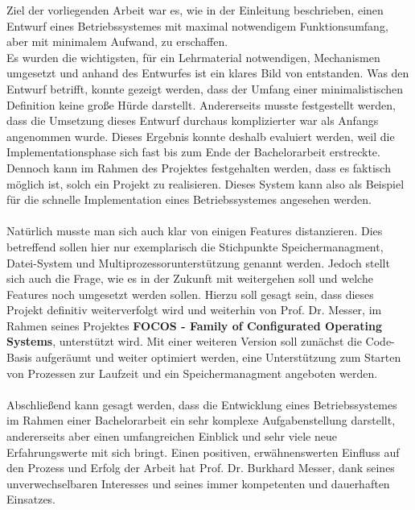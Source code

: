 Ziel der vorliegenden Arbeit war es, wie in der Einleitung beschrieben, einen Entwurf eines Betriebssystemes mit maximal notwendigem Funktionsumfang, aber mit minimalem Aufwand, zu erschaffen.\\
Es wurden die wichtigsten, f\"ur ein Lehrmaterial notwendigen, Mechanismen umgesetzt und anhand des Entwurfes ist ein klares Bild von \mops entstanden. Was den Entwurf betrifft, konnte gezeigt werden, dass der Umfang einer minimalistischen Definition keine gro\ss e H\"urde darstellt. Andererseits musste festgestellt werden, dass die Umsetzung dieses Entwurf durchaus komplizierter war als Anfangs angenommen wurde. Dieses Ergebnis konnte deshalb evaluiert werden, weil die Implementationsphase sich fast bis zum Ende der Bachelorarbeit erstreckte. Dennoch kann im Rahmen des Projektes festgehalten werden, dass es faktisch m\"oglich ist, solch ein Projekt zu realisieren. Dieses System kann also als Beispiel f\"ur die schnelle Implementation eines Betriebssystemes angesehen werden.\\\\
Nat\"urlich musste man sich auch klar von einigen Features distanzieren. Dies betreffend sollen hier nur exemplarisch die Stichpunkte Speichermanagment, Datei-System und Multiprozessorunterst\"utzung genannt werden. Jedoch stellt sich auch die Frage, wie es in der Zukunft mit \mops weitergehen soll und welche Features noch umgesetzt werden sollen. Hierzu soll gesagt sein, dass dieses Projekt definitiv weiterverfolgt wird und weiterhin von Prof. Dr. Messer, im Rahmen seines Projektes \textbf{FOCOS - Family of Configurated Operating Systems}, unterst\"utzt wird. Mit einer weiteren Version soll zun\"achst die Code-Basis aufger\"aumt und weiter optimiert werden, eine Unterst\"utzung zum Starten von Prozessen zur Laufzeit und ein Speichermanagment angeboten werden.\\\\
Abschlie\ss end kann gesagt werden, dass die Entwicklung eines Betriebssystemes im Rahmen einer Bachelorarbeit ein sehr komplexe Aufgabenstellung darstellt, andererseits aber einen umfangreichen Einblick und sehr viele neue Erfahrungswerte mit sich bringt. Einen positiven, erw\"ahnenswerten Einfluss  auf den Prozess und Erfolg der Arbeit hat Prof. Dr. Burkhard Messer, dank seines unverwechselbaren Interesses und seines immer kompetenten und dauerhaften Einsatzes.
\nocite{clanguageII}